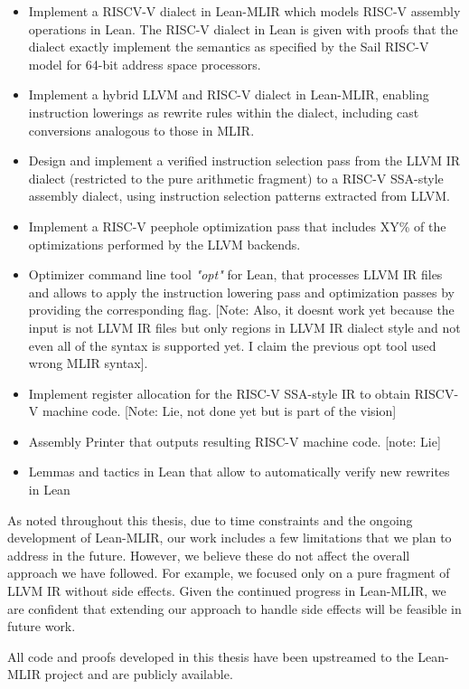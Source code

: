 \begin{itemize}
\item {Implement a RISCV-V dialect in Lean-MLIR which models RISC-V assembly operations in Lean. The RISC-V dialect in Lean is given with proofs that the dialect exactly implement the semantics as specified by the Sail RISC-V model for 64-bit address space processors.}

\item {Implement a hybrid LLVM and RISC-V dialect in Lean-MLIR, enabling instruction lowerings as rewrite rules within the dialect, including cast conversions analogous to those in MLIR.}

\item {Design and implement a verified instruction selection pass from the LLVM IR dialect (restricted to the pure arithmetic fragment) to a RISC-V SSA-style assembly dialect, using instruction selection patterns extracted from LLVM.}

\item {Implement a RISC-V peephole optimization pass that includes XY\% of the optimizations performed by the LLVM backends.}

\item {Optimizer command line tool \textit{"opt"} for Lean, that processes LLVM IR files and allows to apply the instruction lowering pass and optimization passes by providing the corresponding flag.
[Note: Also, it doesnt work yet because the input is not LLVM IR files but only regions in LLVM IR dialect style and not even all of the syntax is supported yet. I claim the previous opt tool used wrong MLIR syntax].}

\item {Implement register allocation for the RISC-V SSA-style IR to obtain RISCV-V machine code.
[Note: Lie, not done yet but is part of the vision]}

\item {Assembly Printer that outputs resulting RISC-V machine code.
[note: Lie]}

\item {Lemmas and tactics in Lean that allow to automatically verify new rewrites in Lean}

\end{itemize}

As noted throughout this thesis, due to time constraints and the ongoing development of Lean-MLIR, our work includes a few limitations that we plan to address in the future. However, we believe these do not affect the overall approach we have followed. For example, we focused only on a pure fragment of LLVM IR without side effects. Given the continued progress in Lean-MLIR, we are confident that extending our approach to handle side effects will be feasible in future work.

All code and proofs developed in this thesis have been upstreamed to the Lean-MLIR project and are publicly available.
